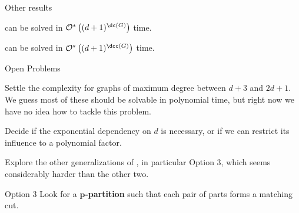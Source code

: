 \begin{frame}{Other results}
    \begin{theorem}
         can be solved in $\bigOs{(d+1)^{\dc(G)}}$ time.
    \end{theorem}
    \pause
    \begin{theorem}
         can be solved in $\bigOs{(d+1)^{\dcc(G)}}$ time.
    \end{theorem}
\end{frame}

\begin{frame}{Open Problems}
    \begin{block}{}
        Settle the complexity for graphs of maximum degree between $d+3$ and $2d+1$.
        We guess most of these should be solvable in polynomial time, but right now we have no idea how to tackle this problem.
    \end{block}
    \pause
    \begin{block}{}
        Decide if the exponential dependency on $d$ is necessary, or if we can restrict its influence to a polynomial factor.
    \end{block}
    \pause
    \begin{block}{}
        Explore the other generalizations of , in particular Option 3, which seems considerably harder than the other two.
    \end{block}
    \begin{block}{Option 3}
        Look for a \textbf{$\boldsymbol{p}$-partition}  such that each pair of parts forms a matching cut.
    \end{block}
\end{frame}
